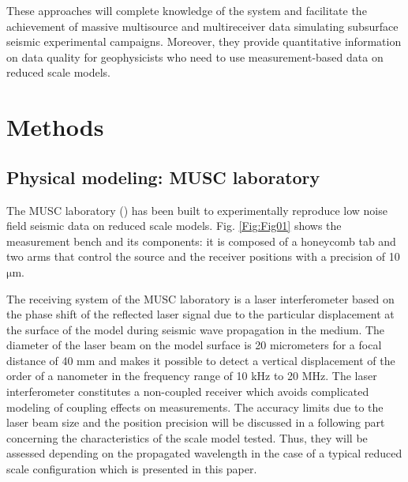 \documentclass[extra,mreferee]{gji}
\begin{document}
These approaches will complete knowledge of the system and facilitate the achievement of massive multisource and multireceiver data simulating subsurface seismic experimental campaigns. Moreover, they provide quantitative information on data quality for geophysicists who need to use measurement-based data on reduced scale models. 

\section{Methods}

\subsection{Physical modeling: MUSC laboratory}

The MUSC laboratory (\cite{Bretaudeau_SSA_2008b,bretaudeau2011ssm,bretaudeau2013fwi}) has been built to experimentally reproduce low noise field seismic data on reduced scale models. Fig. \ref{Fig:Fig01} shows the measurement bench and its components: it is composed of a honeycomb tab and two arms that control the source and the receiver positions with a precision of 10 $\mathrm{\mu m}$.

The receiving system of the MUSC laboratory is a laser interferometer based on the phase shift of the reflected laser signal due to the particular displacement at the surface of the model during seismic wave propagation in the medium. The diameter of the laser beam on the model surface is 20 micrometers for a focal distance of 40 mm and makes it possible to detect a vertical displacement of the order of a nanometer in the frequency range of 10 kHz to 20 MHz. The laser interferometer constitutes a non-coupled receiver which avoids complicated modeling of coupling effects on measurements. The accuracy limits due to the laser beam size and the position precision will be discussed in a following part concerning the characteristics of the scale model tested. Thus, they will be assessed depending on the propagated wavelength in the case of a typical reduced scale configuration which is presented in this paper.
\end{document}
